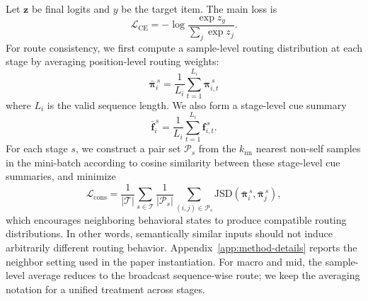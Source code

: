 \documentclass[sigconf,review,anonymous]{acmart}
\begin{document}
Let $\mathbf{z}$ be final logits and $y$ be the target item. The main loss is
\[
\mathcal{L}_{\mathrm{CE}}
=
-\log \frac{\exp z_y}{\sum_{j}\exp z_j}.
\]
For route consistency, we first compute a sample-level routing distribution at each stage by averaging position-level routing weights:
\[
\bar{\boldsymbol{\pi}}_i^{\,s}
=
\frac{1}{L_i}\sum_{t=1}^{L_i}\boldsymbol{\pi}_{i,t}^{\,s}
\]
where $L_i$ is the valid sequence length. We also form a stage-level cue summary
\[
\bar{\mathbf{f}}_i^{\,s}
=
\frac{1}{L_i}\sum_{t=1}^{L_i}\mathbf{f}_{i,t}^{\,s}.
\]
For each stage $s$, we construct a pair set $\mathcal{P}_s$ from the $k_{\mathrm{nn}}$ nearest non-self samples in the mini-batch according to cosine similarity between these stage-level cue summaries, and minimize
\[
\mathcal{L}_{\mathrm{cons}}
=
\frac{1}{|\mathcal{T}|}
\sum_{s \in \mathcal{T}}
\frac{1}{|\mathcal{P}_s|}
\sum_{(i,j)\in \mathcal{P}_s}
\mathrm{JSD}\!\left(\bar{\boldsymbol{\pi}}_i^{\,s}, \bar{\boldsymbol{\pi}}_j^{\,s}\right),
\]
which encourages neighboring behavioral states to produce compatible routing distributions. In other words, semantically similar inputs should not induce arbitrarily different routing behavior. Appendix~\ref{app:method-details} reports the neighbor setting used in the paper instantiation.
For macro and mid, the sample-level average reduces to the broadcast sequence-wise route; we keep the averaging notation for a unified treatment across stages.
\end{document}

